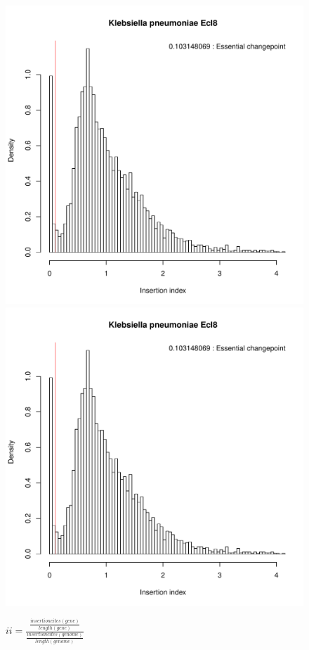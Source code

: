 \documentclass[a4paper,10pt]{article}
\begin{document}
\begin{figure}
\includegraphics[scale=0.2, page=11]{mixtools-no.pdf}
\includegraphics[scale=0.2, page=12]{mixtools-no.pdf}
\caption{$ii=\frac{\frac{insertioncites(gene)}{length(gene)}}{\frac{insertioncites(genome)}{length(genome)}}$\newline
}
\end{figure}
\end{document}
